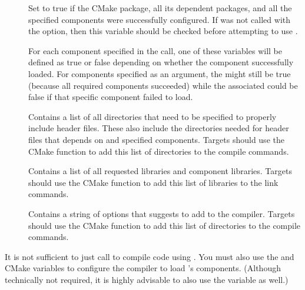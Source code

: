 \begin{description}
\item[]
  Set to true if the \VTKm CMake package, all its dependent packages, and all the specified components were successfully configured.
  If  was not called with the  option, then this variable should be checked before attempting to use \VTKm.
\item[]
  For each component specified in the  call, one of these variables will be defined as true or false depending on whether the component successfully loaded.
  For components specified as an  argument, the  might still be true (because all required components succeeded) while the associated  could be false if that specific component failed to load.
\item[]
  Contains a list of all directories that need to be specified to properly include \VTKm header files.
  These also include the directories needed for header files that \VTKm depends on and specified components.
  Targets should use the  CMake function to add this list of directories to the compile commands.
\item[]
  Contains a list of all requested \VTKm libraries and component libraries.
  Targets should use the  CMake function to add this list of libraries to the link commands.
\item[]
  Contains a string of options that \VTKm suggests to add to the compiler.
  Targets should use the  CMake function to add this list of directories to the compile commands.
\end{description}

\begin{commonerrors}
  It is not sufficient to just call  to compile code using \VTKm.
  You must also use the  and  CMake variables to configure the compiler to load \VTKm's components.
  (Although technically not required, it is highly advisable to also use the  variable as well.) 
\end{commonerrors}


